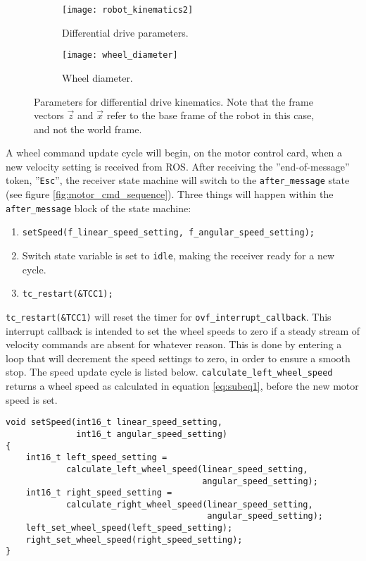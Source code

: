  \begin{figure}[H]
 	\centering
 	\begin{subfigure}[b]{0.58\textwidth}
 		\texttt{[image: robot\_kinematics2]}
 		\caption{Differential drive parameters.}
 		\label{fig:robot_kinematics}
 	\end{subfigure}
 	\begin{subfigure}[b]{0.38\textwidth}
 		
 		\texttt{[image: wheel\_diameter]}
 		\caption{Wheel diameter.}
 		\label{fig:wheel_diameter}
 	\end{subfigure}
 	\caption{\label{fig:wheel_diameter}Parameters for differential drive kinematics. Note that the frame vectors $\vec{z}$ and $\vec{x}$ refer to the base frame of the robot in this case, and not the world frame.}
 \end{figure}

A wheel command update cycle will begin, on the motor control card, when a new velocity setting is received from \ac{ROS}. After receiving the ''end-of-message'' token, ''\texttt{Esc}'', the receiver state machine will switch to the \texttt{after\_message} state (see figure \ref{fig:motor_cmd_sequence}). Three things will happen within the \texttt{after\_message} block of the state machine:

\begin{enumerate}
	\item \texttt{setSpeed(f\_linear\_speed\_setting, f\_angular\_speed\_setting);}
	\item Switch state variable is set to \texttt{idle}, making the receiver ready for a new cycle.
	\item \texttt{tc\_restart(\&TCC1);}
\end{enumerate}

\texttt{tc\_restart(\&TCC1)} will reset the timer for \texttt{ovf\_interrupt\_callback}. This interrupt callback is intended to set the wheel speeds to zero if a steady stream of velocity commands are absent for whatever reason. This is done by entering a loop that will decrement the speed settings to zero, in order to ensure a smooth stop. The speed update cycle is listed below. \texttt{calculate\_left\_wheel\_speed} returns a wheel speed as calculated in equation \ref{eq:subeq1}, before the new motor speed is set.

\begin{lstlisting}
void setSpeed(int16_t linear_speed_setting, 
              int16_t angular_speed_setting)
{
    int16_t left_speed_setting = 
            calculate_left_wheel_speed(linear_speed_setting,
                                       angular_speed_setting);
    int16_t right_speed_setting = 
            calculate_right_wheel_speed(linear_speed_setting,
                                        angular_speed_setting);
    left_set_wheel_speed(left_speed_setting);
    right_set_wheel_speed(right_speed_setting);
}
\end{lstlisting}

